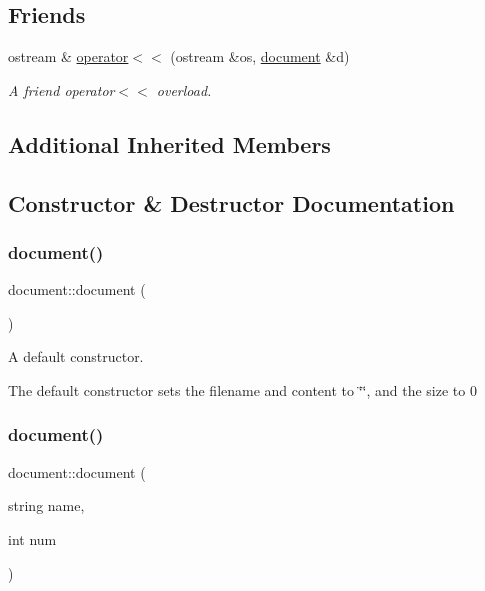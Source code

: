 \subsection*{Friends}
\begin{DoxyCompactItemize}
\item 
ostream \& \hyperlink{classdocument_aafdf2f4ecb817252c0e22f7c072ec5b0}{operator$<$$<$} (ostream \&os, \hyperlink{classdocument}{document} \&d)
\begin{DoxyCompactList}\small\item\em A friend operator$<$$<$ overload. \end{DoxyCompactList}\end{DoxyCompactItemize}
\subsection*{Additional Inherited Members}


\subsection{Constructor \& Destructor Documentation}
\mbox{\label{classdocument_af1a85718219b8da6f1befaac0bf87989}} 
\subsubsection{\texorpdfstring{document()}{document()}\hspace{0.1cm}{\footnotesize\ttfamily [1/2]}}
{\footnotesize\ttfamily document\+::document (\begin{DoxyParamCaption}{ }\end{DoxyParamCaption})}



A default constructor. 

The default constructor sets the filename and content to \char`\"{}\char`\"{}, and the size to 0 \mbox{\label{classdocument_af8e0d4d3a3eeeac31022ebe0e76c5571}} 
\subsubsection{\texorpdfstring{document()}{document()}\hspace{0.1cm}{\footnotesize\ttfamily [2/2]}}
{\footnotesize\ttfamily document\+::document (\begin{DoxyParamCaption}\item[{string}]{name,  }\item[{int}]{num }\end{DoxyParamCaption})}



